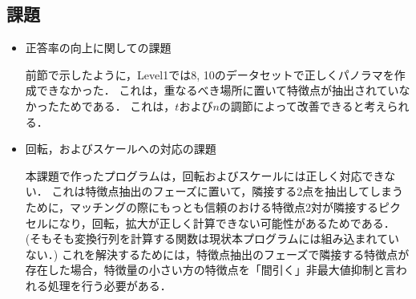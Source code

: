 \subsection{課題}
\begin{itemize}
    \setlength{\itemsep}{5mm}
    \item 正答率の向上に関しての課題
    
    \vspace{1mm}
    \quad
    前節で示したように，Level1では8, 10のデータセットで正しくパノラマを作成できなかった．
    これは，重なるべき場所に置いて特徴点が抽出されていなかったためである．
    これは，$t$および$n$の調節によって改善できると考えられる．
    \item 回転，およびスケールへの対応の課題
    
    \vspace{1mm}
    \quad
    本課題で作ったプログラムは，回転およびスケールには正しく対応できない．
    これは特徴点抽出のフェーズに置いて，隣接する2点を抽出してしまうために，マッチングの際にもっとも信頼のおける特徴点2対が隣接するピクセルになり，回転，拡大が正しく計算できない可能性があるためである．(そもそも変換行列を計算する関数は現状本プログラムには組み込まれていない．)
    これを解決するためには，特徴点抽出のフェーズで隣接する特徴点が存在した場合，特徴量の小さい方の特徴点を「間引く」非最大値抑制と言われる処理を行う必要がある．
\end{itemize}